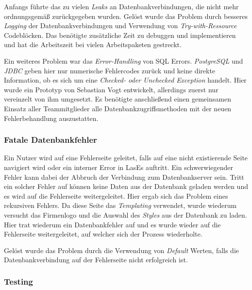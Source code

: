 Anfangs führte das zu vielen \emph{Leaks} an Datenbankverbindungen, die nicht mehr ordnungsgemäß zurückgegeben wurden. Gelöst wurde das Problem durch besseres \emph{Logging} der Datenbankverbindungen und Verwendung von \emph{Try-with-Ressource} Codeblöcken. Das benötigte zusätzliche Zeit zu debuggen und implementieren und hat die Arbeitszeit bei vielen Arbeitspaketen gestreckt.

Ein weiteres Problem war das \emph{Error-Handling} von SQL Errors. \emph{PostgreSQL} und \emph{JDBC} geben hier nur numerische Fehlercodes zurück und keine direkte Information, ob es sich um eine \emph{Checked- oder Unchecked Exception} handelt. Hier wurde ein Prototyp von Sebastian Vogt entwickelt, allerdings zuerst nur vereinzelt von ihm umgesetzt. Es benötigte anschließend einen gemeinsamen Einsatz aller Teammitglieder alle Datenbankzugriffsmethoden mit der neuen Fehlerbehandlung auszustatten.

\subsubsection{Fatale Datenbankfehler}

Ein Nutzer wird auf eine Fehlerseite geleitet, falls auf eine nicht existierende Seite navigiert wird oder ein interner Error in LasEs auftritt.
Ein schwerwiegender Fehler kann dabei der Abbruch der Verbindung zum Datenbankserver sein.
Tritt ein solcher Fehler auf können keine Daten aus der Datenbank geladen werden und es wird auf die Fehlerseite weitergeleitet. Hier ergab sich das Problem eines rekursiven Fehlers.\newline
Da diese Seite das \emph{Templating} verwendet, wurde wiederum versucht das Firmenlogo und die Auswahl des \emph{Styles}  aus der Datenbank zu laden. Hier trat wiederum ein Datenbankfehler auf und es wurde wieder auf die Fehlerseite weitergeleitet, auf welcher sich der Prozess wiederholte.

Gelöst wurde das Problem durch die Verwendung von \emph{Default} Werten, falls die Datenbankverbindung auf der Fehlerseite nicht erfolgreich ist.

\subsubsection{Testing}

